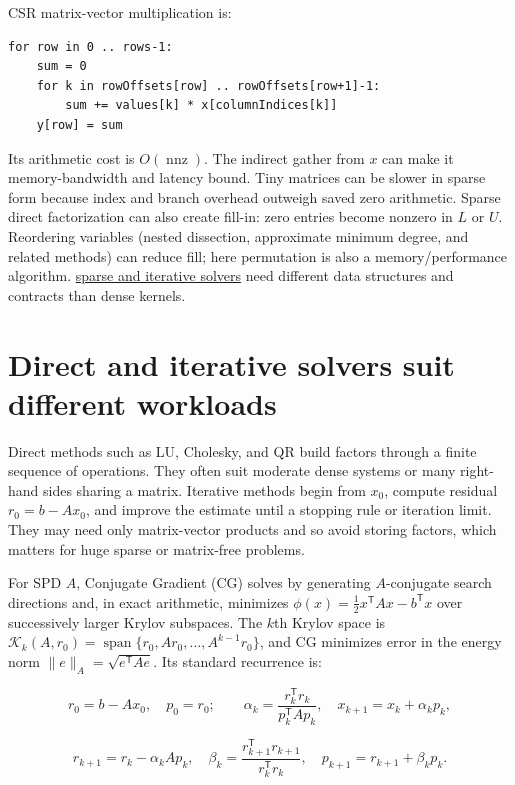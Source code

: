 CSR matrix-vector multiplication is:

\begin{verbatim}
for row in 0 .. rows-1:
    sum = 0
    for k in rowOffsets[row] .. rowOffsets[row+1]-1:
        sum += values[k] * x[columnIndices[k]]
    y[row] = sum
\end{verbatim}

Its arithmetic cost is \(O(\operatorname{nnz})\). The indirect gather from \(x\) can make it memory-bandwidth and latency bound. Tiny matrices can be slower in sparse form because index and branch overhead outweigh saved zero arithmetic. Sparse direct factorization can also create fill-in: zero entries become nonzero in \(L\) or \(U\). Reordering variables (nested dissection, approximate minimum degree, and related methods) can reduce fill; here permutation is also a memory/performance algorithm. \hyperref[02-foundations-ii-ch038-sparse-storage-changes-the-cost-model]{sparse and iterative solvers} need different data structures and contracts than dense kernels.

\section{Direct and iterative solvers suit different workloads}\label{02-foundations-ii-ch038-direct-and-iterative-solvers-suit-different-workloads}

Direct methods such as LU, Cholesky, and QR build factors through a finite sequence of operations. They often suit moderate dense systems or many right-hand sides sharing a matrix. Iterative methods begin from \(x_0\), compute residual \(r_0=b-Ax_0\), and improve the estimate until a stopping rule or iteration limit. They may need only matrix-vector products and so avoid storing factors, which matters for huge sparse or matrix-free problems.

For SPD \(A\), Conjugate Gradient (CG) solves by generating \(A\)-conjugate search directions and, in exact arithmetic, minimizes \(\phi(x)=\tfrac12x^\mathsf TAx-b^\mathsf Tx\) over successively larger Krylov subspaces. The \(k\)th Krylov space is \(\mathcal K_k(A,r_0)=\operatorname{span}\{r_0,Ar_0,\ldots,A^{k-1}r_0\}\), and CG minimizes error in the energy norm \(\|e\|_A=\sqrt{e^\mathsf TAe}\). Its standard recurrence is:

\[
r_0=b-Ax_0,\quad p_0=r_0;
\qquad \alpha_k=\frac{r_k^\mathsf Tr_k}{p_k^\mathsf TAp_k},\quad
x_{k+1}=x_k+\alpha_kp_k,
\]

\[
r_{k+1}=r_k-\alpha_kAp_k,\quad
\beta_k=\frac{r_{k+1}^\mathsf Tr_{k+1}}{r_k^\mathsf Tr_k},\quad
p_{k+1}=r_{k+1}+\beta_kp_k.
\]

